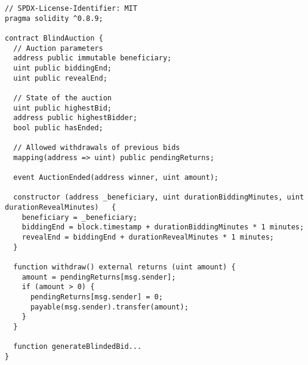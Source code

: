 \begin{lstlisting}[language=Solidity]
// SPDX-License-Identifier: MIT
pragma solidity ^0.8.9;

contract BlindAuction {
  // Auction parameters
  address public immutable beneficiary;
  uint public biddingEnd;
  uint public revealEnd;
  
  // State of the auction
  uint public highestBid;
  address public highestBidder;
  bool public hasEnded;
  
  // Allowed withdrawals of previous bids
  mapping(address => uint) public pendingReturns;
  
  event AuctionEnded(address winner, uint amount);

  constructor (address _beneficiary, uint durationBiddingMinutes, uint durationRevealMinutes) 	{
    beneficiary = _beneficiary;
    biddingEnd = block.timestamp + durationBiddingMinutes * 1 minutes;
    revealEnd = biddingEnd + durationRevealMinutes * 1 minutes;
  }
  
  function withdraw() external returns (uint amount) {
    amount = pendingReturns[msg.sender];
    if (amount > 0) {
      pendingReturns[msg.sender] = 0;
      payable(msg.sender).transfer(amount);
    }
  }
  
  function generateBlindedBid...
}
	
\end{lstlisting}
